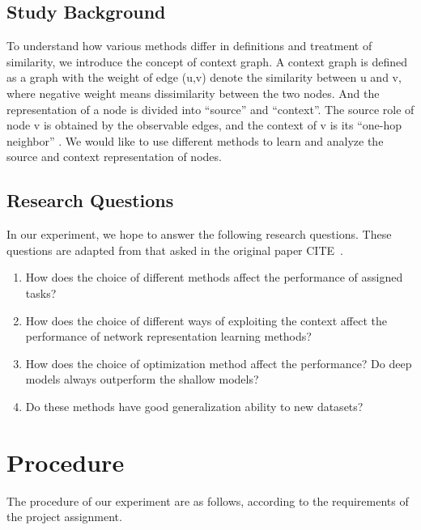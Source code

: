 \documentclass[a4paper]{article}
\newcommand{\citehere}{\textcolor[rgb]{1,0,0}{CITE\ }}
\begin{document}
\subsection{Study Background}


\noindent To understand how various methods differ in definitions and treatment of similarity, we introduce the concept of context graph. A context graph is defined as a graph with the weight of edge (u,v) denote the similarity between u and v, where negative weight means dissimilarity between the two nodes. And the representation of a node is divided into “source” and “context”. The source role of node v is obtained by the observable edges, and the context of v is its “one-hop neighbor” \cite{1}. We would like to use different methods to learn and analyze the source and context representation of nodes.


\subsection{Research Questions} 


\noindent In our experiment, we hope to answer the following research questions. These questions are adapted from that asked in the original paper \citehere.

\begin{enumerate}[1.]

\item How does the choice of different methods affect the performance of assigned tasks?

\item How does the choice of different ways of exploiting the context affect the performance of network representation learning methods? 

\item How does the choice of optimization method affect the performance? Do deep models always outperform the shallow models? 

\item Do these methods have good generalization ability to new datasets?

\end{enumerate}

\section{Procedure}

\noindent The procedure of our experiment are as follows, according to the requirements of the project assignment.
\end{document}
